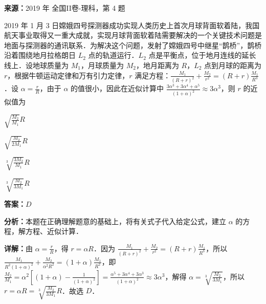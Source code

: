 \begin{question}[points=5]
\textbf{来源：}2019 年 全国II卷-理科，第 4 题\par
2019 年 1 月 3 日嫦娥四号探测器成功实现人类历史上首次月球背面软着陆，我国航天事业取得又一重大成就，实现月球背面软着陆需要解决的一个关键技术问题是地面与探测器的通讯联系．为解决这个问题，发射了嫦娥四号中继星“鹊桥”，鹊桥沿着围绕地月拉格朗日 $L_2$ 点的轨道运行．$L_2$ 点是平衡点，位于地月连线的延长线上．设地球质量为 $M_1$，月球质量为 $M_2$，地月距离为 $R$，$L_2$ 点到月球的距离为 $r$，根据牛顿运动定律和万有引力定律，$r$ 满足方程：$\frac{M_1}{(R+r)^2}+\frac{M_2}{r^2}=(R+r)\frac{M_1}{R^3}$．设 $\alpha=\frac{r}{R}$，由于 $\alpha$ 的值很小，因此在近似计算中 $\frac{3\alpha^3+3\alpha^4+\alpha^5}{(1+\alpha)^2}\approx 3\alpha^3$，则 $r$ 的近似值为
\begin{choices}
  \item $\sqrt{\frac{M_2}{M_1}}R$
  \item $\sqrt{\frac{M_2}{2M_1}}R$
  \item $\sqrt[3]{\frac{3M_2}{M_1}}R$
  \item $\sqrt[3]{\frac{M_2}{3M_1}}R$
\end{choices}
\begin{solution}
\textbf{答案：}$D$

\textbf{分析：}本题在正确理解题意的基础上，将有关式子代入给定公式，建立 $\alpha$ 的方程，解方程、近似计算．

\textbf{详解：}由 $\alpha=\frac{r}{R}$，得 $r=\alpha R$．因为 $\frac{M_1}{(R+r)^2}+\frac{M_2}{r^2}=(R+r)\frac{M_1}{R^3}$，所以 $\frac{M_1}{R^2(1+\alpha)^2}+\frac{M_2}{\alpha^2 R^2}=(1+\alpha)\frac{M_1}{R^2}$，即 $\frac{M_2}{M_1}=\alpha^2[(1+\alpha)-\frac{1}{(1+\alpha)^2}]=\frac{\alpha^5+3\alpha^4+3\alpha^3}{(1+\alpha)^2}\approx 3\alpha^3$，解得 $\alpha=\sqrt[3]{\frac{M_2}{3M_1}}$，所以 $r=\alpha R=\sqrt[3]{\frac{M_2}{3M_1}}R$．故选 $D$．
\end{solution}
\end{question}

